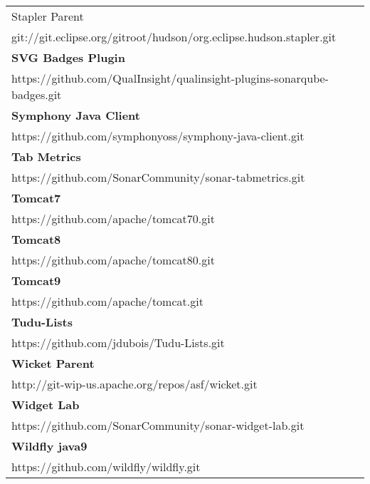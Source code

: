 \begin{table}[]
\begin{tabular}{|p{130mm}|}
Stapler Parent                                     \\ git://git.eclipse.org/gitroot/hudson/org.eclipse.hudson.stapler.git          \\ \hline \bf
SVG Badges Plugin                                  \\ https://github.com/QualInsight/qualinsight-plugins-sonarqube-badges.git      \\ \hline \bf
Symphony Java Client                               \\ https://github.com/symphonyoss/symphony-java-client.git                      \\ \hline \bf 
Tab Metrics                                        \\ https://github.com/SonarCommunity/sonar-tabmetrics.git                       \\ \hline \bf
Tomcat7                                            \\ https://github.com/apache/tomcat70.git                                       \\ \hline \bf
Tomcat8                                            \\ https://github.com/apache/tomcat80.git                                       \\ \hline \bf
Tomcat9                                            \\ https://github.com/apache/tomcat.git                                         \\ \hline \bf
Tudu-Lists                                         \\ https://github.com/jdubois/Tudu-Lists.git                                    \\ \hline \bf
Wicket Parent                                      \\ http://git-wip-us.apache.org/repos/asf/wicket.git                            \\ \hline \bf
Widget Lab                                         \\ https://github.com/SonarCommunity/sonar-widget-lab.git                       \\ \hline \bf
Wildfly java9                                     \\ https://github.com/wildfly/wildfly.git                                       \\ \hline

\end{tabular}
\end{table}